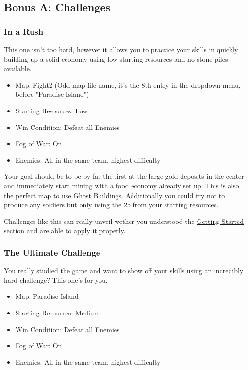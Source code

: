 \documentclass[12pt]{article}
\begin{document}
\subsection{Bonus A: Challenges}
\label{sec:challenges}

\subsubsection{In a Rush}
\label{sec:challenge_rush}

This one isn't too hard, however it allows you to practice your skills in quickly building up a solid economy using low starting resources and no stone piles available.

\begin{itemize}
    \item Map: Fight2 (Odd map file name, it's the 8th entry in the dropdown menu, before "Paradise Island")
    \item \hyperref[sec:startingresources]{Starting Resources}: Low
    \item Win Condition: Defeat all Enemies
    \item Fog of War: On
    \item Enemies: All in the same team, highest difficulty
\end{itemize}

Your goal should be to be by far the first at the large gold deposits in the center and immediately start mining with a food economy already set up. This is also the perfect map to use \hyperref[sec:ghostbuildings]{Ghost Buildings}. Additionally you could try not to produce any soldiers but only using the 25 from your starting resources.

Challenges like this can really unveil wether you understood the \hyperref[sec:gettingstarted]{Getting Started} section and are able to apply it properly.

\subsubsection{The Ultimate Challenge}
\label{sec:challenge_ultimate}

You really studied the game and want to show off your skills using an incredibly hard challenge? This one's for you.

\begin{itemize}
  \item Map: Paradise Island
  \item \hyperref[sec:startingresources]{Starting Resources}: Medium
  \item Win Condition: Defeat all Enemies
  \item Fog of War: On
  \item Enemies: All in the same team, highest difficulty
\end{itemize}
\end{document}
